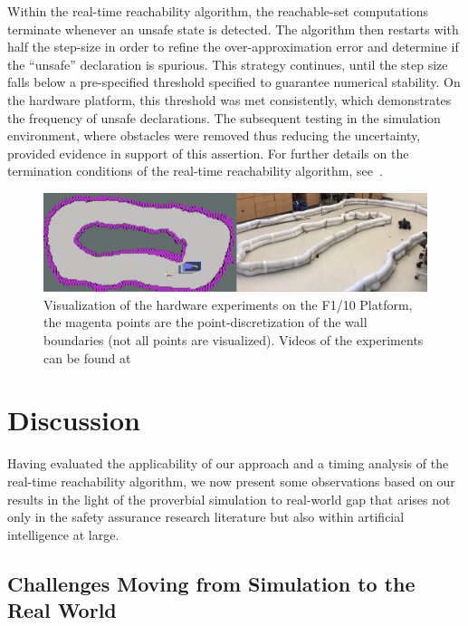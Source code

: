 \documentclass[manuscript,screen,review]{acmart}
\begin{document}
Within the real-time reachability algorithm, the reachable-set computations terminate whenever an unsafe state is detected. The algorithm then restarts with half the step-size in order to refine the over-approximation error and determine if the ``unsafe'' declaration is spurious. This strategy continues, until the step size falls below a pre-specified threshold specified to guarantee numerical stability. On the hardware platform, this threshold was met consistently, which demonstrates the frequency of unsafe declarations. The subsequent testing in the simulation environment, where obstacles were removed thus reducing the uncertainty, provided evidence in support of this assertion. For further details on the termination conditions of the real-time reachability algorithm, see~\cite{Johnson2016}.



\begin{figure}%
  \centering
  \includegraphics[width=\linewidth]{figures/sidebyside.png}
  \caption{Visualization of the hardware experiments on the F1/10 Platform, the magenta points are the point-discretization of the wall boundaries (not all points are visualized). Videos of the experiments can be found at}
  \label{fig:lab_setup}
\end{figure}%



\section{Discussion}

Having evaluated the applicability of our approach and a timing analysis of the real-time reachability algorithm, we now present some observations based on our results in the light of the proverbial simulation to real-world gap that arises not only in the safety assurance research literature but also within artificial intelligence at large.

\subsection{Challenges Moving from Simulation to the Real World}
\end{document}
